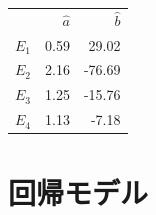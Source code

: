 \begin{table}[http]
 \centering
\begin{tabular}{lrr}
{} &    $\hat{a}$ &      $\hat{b}$ \\
$E_1$ & 0.59 &  29.02 \\
 $E_2$ & 2.16 & -76.69 \\
$E_3$ & 1.25 & -15.76 \\
$E_4$ & 1.13 &  -7.18 \\
\end{tabular}
\end{table}



\chapter{回帰モデル}


